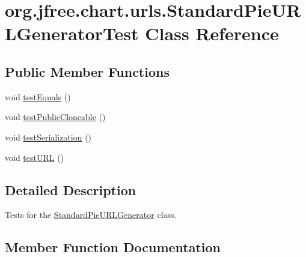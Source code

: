 \hypertarget{classorg_1_1jfree_1_1chart_1_1urls_1_1_standard_pie_u_r_l_generator_test}{}\section{org.\+jfree.\+chart.\+urls.\+Standard\+Pie\+U\+R\+L\+Generator\+Test Class Reference}
\label{classorg_1_1jfree_1_1chart_1_1urls_1_1_standard_pie_u_r_l_generator_test}
\subsection*{Public Member Functions}
\begin{DoxyCompactItemize}
\item 
void \mbox{\hyperlink{classorg_1_1jfree_1_1chart_1_1urls_1_1_standard_pie_u_r_l_generator_test_a4a3684cd756e083290f311eebd0f37eb}{test\+Equals}} ()
\item 
void \mbox{\hyperlink{classorg_1_1jfree_1_1chart_1_1urls_1_1_standard_pie_u_r_l_generator_test_a04bb0430d7c656eab252b57a11c77b91}{test\+Public\+Cloneable}} ()
\item 
void \mbox{\hyperlink{classorg_1_1jfree_1_1chart_1_1urls_1_1_standard_pie_u_r_l_generator_test_a00d56c8540ba0fd58af74cc27735962b}{test\+Serialization}} ()
\item 
void \mbox{\hyperlink{classorg_1_1jfree_1_1chart_1_1urls_1_1_standard_pie_u_r_l_generator_test_a22c037cb0600e3c573560b7d9c208ba6}{test\+U\+RL}} ()
\end{DoxyCompactItemize}


\subsection{Detailed Description}
Tests for the \mbox{\hyperlink{classorg_1_1jfree_1_1chart_1_1urls_1_1_standard_pie_u_r_l_generator}{Standard\+Pie\+U\+R\+L\+Generator}} class. 

\subsection{Member Function Documentation}
\mbox{\label{classorg_1_1jfree_1_1chart_1_1urls_1_1_standard_pie_u_r_l_generator_test_a4a3684cd756e083290f311eebd0f37eb}} 
